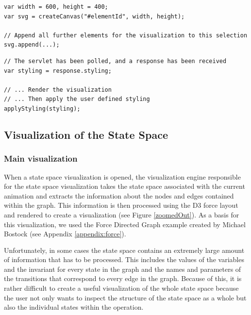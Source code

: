 \begin{lstlisting}[caption=Append a D3 selection to an element that includes support for zooming,label=canvas]
var width = 600, height = 400;
var svg = createCanvas("#elementId", width, height);

// Append all further elements for the visualization to this selection
svg.append(...);
\end{lstlisting}

\begin{lstlisting}[caption=Apply list of \texttt{Transformers} received from servlet,label=applyStyling]
// The servlet has been polled, and a response has been received
var styling = response.styling;

// ... Render the visualization
// ... Then apply the user defined styling
applyStyling(styling);
\end{lstlisting}

\subsection{Visualization of the State Space}

\subsubsection{Main visualization}

When a state space visualization is opened, the visualization engine responsible for the state space visualization takes the state space associated with the current animation and extracts the information about the nodes and edges contained within the graph. This information is then processed using the D3 force layout and rendered to create a visualization (see Figure \ref{zoomedOut}). As a basis for this visualization, we used the Force Directed Graph example created by Michael Bostock (see Appendix \ref{appendix:force}). 

Unfortunately, in some cases the state space contains an extremely large amount of information that has to be processed. This includes the values of the variables and the invariant for every state in the graph and the names and parameters of the transitions that correspond to every edge in the graph. Because of this, it is rather difficult to create a useful visualization of the whole state space because the user not only wants to inspect the structure of the state space as a whole but also the individual states within the operation. 

